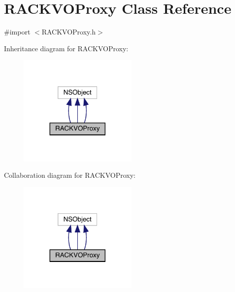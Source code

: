 \hypertarget{interface_r_a_c_k_v_o_proxy}{}\section{R\+A\+C\+K\+V\+O\+Proxy Class Reference}
\label{interface_r_a_c_k_v_o_proxy}


{\ttfamily \#import $<$R\+A\+C\+K\+V\+O\+Proxy.\+h$>$}



Inheritance diagram for R\+A\+C\+K\+V\+O\+Proxy\+:\nopagebreak
\begin{figure}[H]
\begin{center}
\leavevmode
\includegraphics[width=164pt]{interface_r_a_c_k_v_o_proxy__inherit__graph}
\end{center}
\end{figure}


Collaboration diagram for R\+A\+C\+K\+V\+O\+Proxy\+:\nopagebreak
\begin{figure}[H]
\begin{center}
\leavevmode
\includegraphics[width=164pt]{interface_r_a_c_k_v_o_proxy__coll__graph}
\end{center}
\end{figure}
